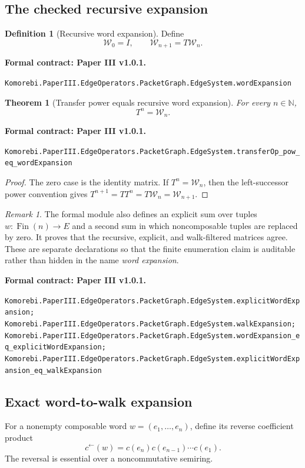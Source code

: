 \documentclass[11pt,a4paper]{article}
\newtheorem{theorem}{Theorem}[section]
\theoremstyle{plain}
\theoremstyle{definition}
\newtheorem{definition}[definition]{Definition}
\theoremstyle{remark}
\newtheorem{remark}[remark]{Remark}
\newcommand{\N}{\mathbb N}
\newcommand{\cW}{\mathcal W}
\newcommand{\leanname}[1]{\nolinkurl{#1}}
\newcommand{\statusleanthree}[1]{\par\smallskip\noindent\begin{minipage}{\linewidth}{\color{leanblue}\textbf{Formal contract: Paper III v1.0.1.}}\par\begingroup\small\raggedright\leanname{#1}\par\endgroup\end{minipage}\par\smallskip}
\begin{document}
\subsection{The checked recursive expansion}

\begin{definition}[Recursive word expansion]
\label{def:recursive-word-expansion}
Define
\[
  \cW_0=I,
  \qquad
  \cW_{n+1}=T\cW_n.
\]
\end{definition}
\statusleanthree{Komorebi.PaperIII.EdgeOperators.PacketGraph.EdgeSystem.wordExpansion}

\begin{theorem}[Transfer power equals recursive word expansion]
\label{thm:power-recursive-expansion}
For every $n\in\N$,
\[
  T^n=\cW_n.
\]
\end{theorem}
\statusleanthree{Komorebi.PaperIII.EdgeOperators.PacketGraph.EdgeSystem.transferOp_pow_eq_wordExpansion}

\begin{proof}
The zero case is the identity matrix.  If $T^n=\cW_n$, then the
left-successor power convention gives
$T^{n+1}=TT^n=T\cW_n=\cW_{n+1}$.
\end{proof}

\begin{remark}
The formal module also defines an explicit sum over tuples
$w:\operatorname{Fin}(n)\to E$ and a second sum in which noncomposable tuples
are replaced by zero.  It proves that the recursive, explicit, and
walk-filtered matrices agree.  These are separate declarations so that the
finite enumeration claim is auditable rather than hidden in the name
\emph{word expansion}.
\end{remark}
\statusleanthree{Komorebi.PaperIII.EdgeOperators.PacketGraph.EdgeSystem.explicitWordExpansion; Komorebi.PaperIII.EdgeOperators.PacketGraph.EdgeSystem.walkExpansion; Komorebi.PaperIII.EdgeOperators.PacketGraph.EdgeSystem.wordExpansion_eq_explicitWordExpansion; Komorebi.PaperIII.EdgeOperators.PacketGraph.EdgeSystem.explicitWordExpansion_eq_walkExpansion}

\subsection{Exact word-to-walk expansion}

For a nonempty composable word $w=(e_1,\ldots,e_n)$, define its reverse
coefficient product
\[
  c^\leftarrow(w)=c(e_n)c(e_{n-1})\cdots c(e_1).
\]
The reversal is essential over a noncommutative semiring.
\end{document}
